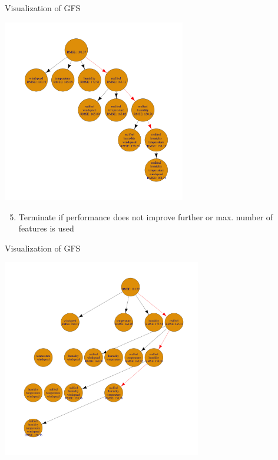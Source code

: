 \documentclass[11pt,compress,t,notes=noshow, xcolor=table]{beamer}
\begin{document}
\begin{frame}[noframenumbering]{Visualization of GFS}
    \begin{center}
      \includegraphics[width = 0.6\textwidth]{figure/fs-wrappers-powerset-tree-4.png}
      \end{center}
      \vspace{-0.2cm}
 \begin{enumerate}
     \setcounter{enumi}{4}
     \item Terminate if performance does not improve further or max. number of features is used
 \end{enumerate}
\end{frame}
  
\begin{frame}[noframenumbering]{Visualization of GFS}
    \begin{center}
    \includegraphics[width = 0.65\textwidth]{figure/fs-wrappers-powerset-all-4.png}
    \end{center}
  \end{frame}
\end{document}
